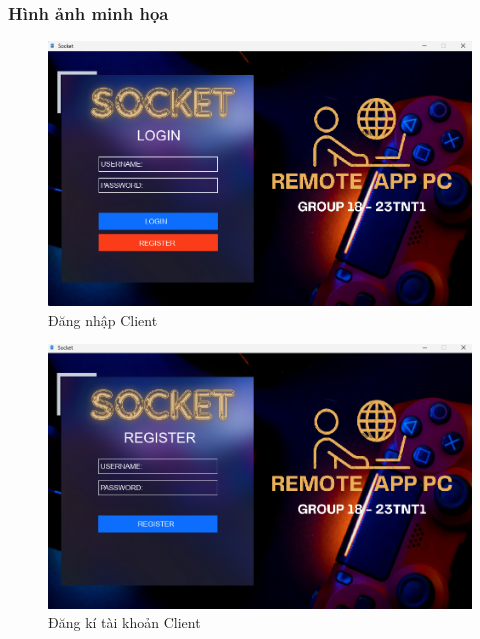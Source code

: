 \subsubsection{Hình ảnh minh họa}
\begin{figure}[H]
    \centering
    \includegraphics[width=0.89\linewidth]{img/login.png}
    \caption{Đăng nhập Client}
\end{figure}

\begin{figure}[H]
    \centering
    \includegraphics[width=0.89\linewidth]{img/register.png}
    \caption{Đăng kí tài khoản Client}
\end{figure}

